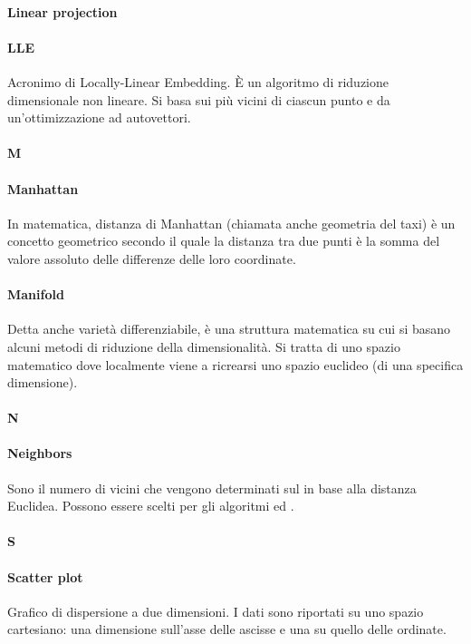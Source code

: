 \paragraph*{Linear projection}

\paragraph*{LLE}
Acronimo di Locally-Linear Embedding. È un algoritmo di riduzione dimensionale non lineare. Si basa sui più vicini  di ciascun punto e da un'ottimizzazione ad autovettori. 

\paragraph*{M}

\paragraph*{Manhattan}
In matematica, distanza di Manhattan (chiamata anche geometria del taxi) è un concetto geometrico secondo il quale la distanza tra due punti è la somma del valore assoluto delle differenze delle loro coordinate. 

\paragraph*{Manifold}
Detta anche varietà differenziabile, è una struttura matematica su cui si basano alcuni metodi di riduzione della dimensionalità. Si tratta di uno spazio matematico dove localmente viene a ricrearsi uno spazio euclideo (di una specifica dimensione).

\paragraph*{N}

\paragraph*{Neighbors}
Sono il numero di vicini che vengono determinati sul  in base alla distanza Euclidea. Possono essere scelti per gli algoritmi  ed .

\paragraph*{S}

\paragraph*{Scatter plot}
Grafico di dispersione a due dimensioni. I dati sono riportati su uno spazio cartesiano: una dimensione sull'asse delle ascisse e una su quello delle ordinate.

